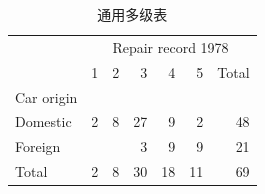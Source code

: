 \begin{table}[htbp]
  \centering
  \caption{ 通用多级表 }
  \label{tab:table}
  \small
  \begin{tabular}{lllllll}
    \toprule
    \multicolumn{1}{c}{} &
      \multicolumn{6}{c}{Repair record 1978} \\
    \multicolumn{1}{c}{} &
      \multicolumn{1}{r}{1} &
      \multicolumn{1}{r}{2} &
      \multicolumn{1}{r}{3} &
      \multicolumn{1}{r}{4} &
      \multicolumn{1}{r}{5} &
      \multicolumn{1}{r}{Total} \\
    \midrule
    \multicolumn{1}{l}{Car origin} &
      \multicolumn{1}{r}{} &
      \multicolumn{1}{r}{} &
      \multicolumn{1}{r}{} &
      \multicolumn{1}{r}{} &
      \multicolumn{1}{r}{} &
      \multicolumn{1}{r}{} \\
    \multicolumn{1}{l}{\hspace{1em}Domestic} &
      \multicolumn{1}{r}{2} &
      \multicolumn{1}{r}{8} &
      \multicolumn{1}{r}{27} &
      \multicolumn{1}{r}{9} &
      \multicolumn{1}{r}{2} &
      \multicolumn{1}{r}{48} \\
    \multicolumn{1}{l}{\hspace{1em}Foreign} &
      \multicolumn{1}{r}{} &
      \multicolumn{1}{r}{} &
      \multicolumn{1}{r}{3} &
      \multicolumn{1}{r}{9} &
      \multicolumn{1}{r}{9} &
      \multicolumn{1}{r}{21} \\
    \multicolumn{1}{l}{\hspace{1em}Total} &
      \multicolumn{1}{r}{2} &
      \multicolumn{1}{r}{8} &
      \multicolumn{1}{r}{30} &
      \multicolumn{1}{r}{18} &
      \multicolumn{1}{r}{11} &
      \multicolumn{1}{r}{69} \\
    \bottomrule
  \end{tabular}
\end{table}
